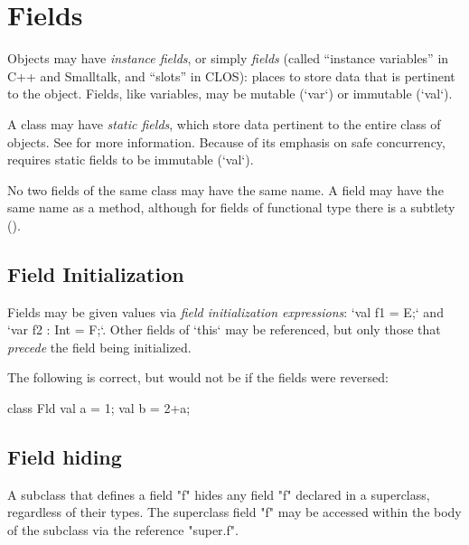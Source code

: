 \section{Fields}
\label{FieldDefinitions}

Objects may have {\em instance fields}, or simply {\em fields} (called
``instance variables'' in C++ and Smalltalk, and ``slots'' in CLOS): places to
store data that is pertinent to the object.  Fields, like variables, may be
mutable (\xcd`var`) or immutable (\xcd`val`).  

A class may have {\em static fields}, which store data pertinent to the
entire class of objects.  See  for more
information. 
Because of its emphasis on safe concurrency, \Xten{} requires static
fields to be immutable (\xcd`val`). 

No two fields of the same class may have the same name.  A field may have the
same name as a method, although for fields of functional type there is a
subtlety ().  

\subsection{Field Initialization}

Fields may be given values via {\em field initialization expressions}:
\xcd`val f1 = E;` and \xcd`var f2 : Int = F;`. Other fields of \xcd`this` may
be referenced, but only those that {\em precede} the field being initialized.


\begin{ex}The following is correct, but would not be if the fields were
reversed:

\begin{xten}
class Fld{
  val a = 1;
  val b = 2+a;
}
\end{xten}
\end{ex}

\subsection{Field hiding}
\label{sect:FieldHiding}


A subclass that defines a field \xcd"f" hides any field \xcd"f"
declared in a superclass, regardless of their types.  The
superclass field \xcd"f" may be accessed within the body of
the subclass via the reference \xcd"super.f".

